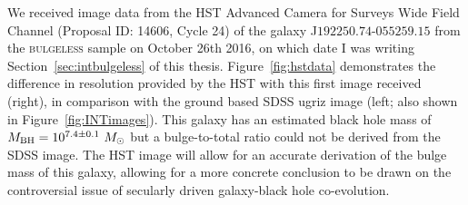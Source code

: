 We received image data from the HST Advanced Camera for Surveys Wide Field Channel (Proposal ID: 14606, Cycle 24) of the galaxy J$192250.74$-$055259.15$ from the \textsc{bulgeless} sample on October 26th 2016, on which date I was writing Section~\ref{sec:intbulgeless} of this thesis. Figure~\ref{fig:hstdata} demonstrates the difference in resolution provided by the HST with this first image received (right), in comparison with the ground based SDSS ugriz image (left; also shown in Figure~\ref{fig:INTimages}). This galaxy has an estimated black hole mass of $M_{\rm{BH}} = 10^{7.4\pm0.1}~M_{\odot}$ but a bulge-to-total ratio could not be derived from the SDSS image. The HST image will allow for an accurate derivation of the bulge mass of this galaxy, allowing for a more concrete conclusion to be drawn on the controversial issue of secularly driven galaxy-black hole co-evolution. 

